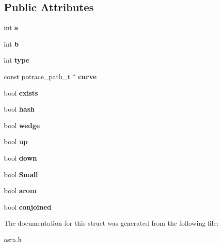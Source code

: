 \subsection*{Public Attributes}
\begin{DoxyCompactItemize}
\item 
\hypertarget{structbond__s_ae921c9b5e12143fff77093b117c1e6ba}{int {\bfseries a}}\label{structbond__s_ae921c9b5e12143fff77093b117c1e6ba}

\item 
\hypertarget{structbond__s_abf78fdbeedc3ea270516be1e65bd090d}{int {\bfseries b}}\label{structbond__s_abf78fdbeedc3ea270516be1e65bd090d}

\item 
\hypertarget{structbond__s_a4cb175cc20f8fae278440bf2e68085e4}{int {\bfseries type}}\label{structbond__s_a4cb175cc20f8fae278440bf2e68085e4}

\item 
\hypertarget{structbond__s_a94f53e6eda21c61cd95c2b1df4391979}{const potrace\-\_\-path\-\_\-t $\ast$ {\bfseries curve}}\label{structbond__s_a94f53e6eda21c61cd95c2b1df4391979}

\item 
\hypertarget{structbond__s_ade93afff92f51bfbab59b6649a4f4e95}{bool {\bfseries exists}}\label{structbond__s_ade93afff92f51bfbab59b6649a4f4e95}

\item 
\hypertarget{structbond__s_a7dc452200cb179e85d4e3d4a96603f6a}{bool {\bfseries hash}}\label{structbond__s_a7dc452200cb179e85d4e3d4a96603f6a}

\item 
\hypertarget{structbond__s_aeb1030e04d3fc17235a15a6b92ded2d8}{bool {\bfseries wedge}}\label{structbond__s_aeb1030e04d3fc17235a15a6b92ded2d8}

\item 
\hypertarget{structbond__s_a2d1bccb863c4250bb64a65b0d1549130}{bool {\bfseries up}}\label{structbond__s_a2d1bccb863c4250bb64a65b0d1549130}

\item 
\hypertarget{structbond__s_ac61f88da16626325fc771760dfb7b4fc}{bool {\bfseries down}}\label{structbond__s_ac61f88da16626325fc771760dfb7b4fc}

\item 
\hypertarget{structbond__s_a9c34f9df6b51aded60b378d085aa6a03}{bool {\bfseries Small}}\label{structbond__s_a9c34f9df6b51aded60b378d085aa6a03}

\item 
\hypertarget{structbond__s_a8d4ed8996f9b99d1a45a002e073092c2}{bool {\bfseries arom}}\label{structbond__s_a8d4ed8996f9b99d1a45a002e073092c2}

\item 
\hypertarget{structbond__s_a043324169531e5cc4626a43aa5fbb310}{bool {\bfseries conjoined}}\label{structbond__s_a043324169531e5cc4626a43aa5fbb310}

\end{DoxyCompactItemize}


The documentation for this struct was generated from the following file\-:\begin{DoxyCompactItemize}
\item 
osra.\-h\end{DoxyCompactItemize}

